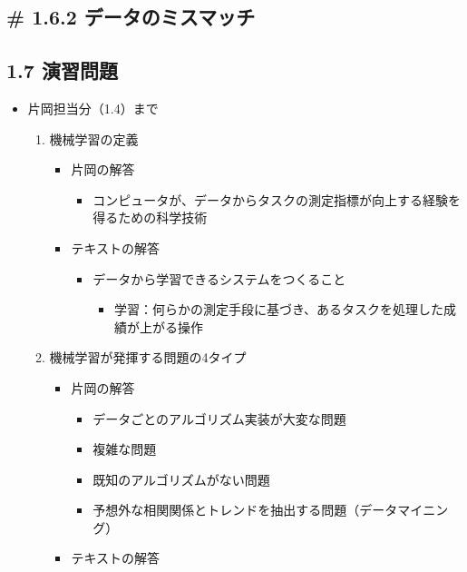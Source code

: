 \hypertarget{ux30c7ux30fcux30bfux306eux30dfux30b9ux30deux30c3ux30c1}{%
\subsection{\# 1.6.2
データのミスマッチ}\label{ux30c7ux30fcux30bfux306eux30dfux30b9ux30deux30c3ux30c1}}

\hypertarget{ux6f14ux7fd2ux554fux984c}{%
\subsection{1.7 演習問題}\label{ux6f14ux7fd2ux554fux984c}}

\begin{itemize}
\tightlist
\item
  片岡担当分（1.4）まで

  \begin{enumerate}
  \def\labelenumi{\arabic{enumi}.}
  \tightlist
  \item
    機械学習の定義

    \begin{itemize}
    \tightlist
    \item
      片岡の解答

      \begin{itemize}
      \tightlist
      \item
        コンピュータが、データからタスクの測定指標が向上する経験を得るための科学技術
      \end{itemize}
    \item
      テキストの解答

      \begin{itemize}
      \tightlist
      \item
        データから学習できるシステムをつくること

        \begin{itemize}
        \tightlist
        \item
          学習：何らかの測定手段に基づき、あるタスクを処理した成績が上がる操作
        \end{itemize}
      \end{itemize}
    \end{itemize}
  \item
    機械学習が発揮する問題の4タイプ

    \begin{itemize}
    \tightlist
    \item
      片岡の解答

      \begin{itemize}
      \tightlist
      \item
        データごとのアルゴリズム実装が大変な問題
      \item
        複雑な問題
      \item
        既知のアルゴリズムがない問題
      \item
        予想外な相関関係とトレンドを抽出する問題（データマイニング）
      \end{itemize}
    \item
      テキストの解答


\end{itemize}
\end{enumerate}
\end{itemize}
